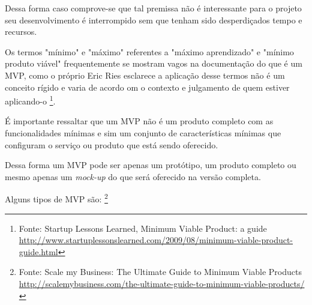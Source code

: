     \par Dessa forma caso comprove-se que tal premissa não é interessante para o projeto seu desenvolvimento é interrompido sem que tenham sido desperdiçados tempo e recursos.
    \par Os termos "mínimo" e "máximo" referentes a "máximo aprendizado" e "mínimo produto viável" frequentemente se mostram vagos na documentação do que é um MVP, como o próprio Eric Ries esclarece a aplicação desse termos não é um conceito rígido e varia de acordo om o contexto e julgamento de quem estiver aplicando-o \footnote{Fonte: Startup Lessons Learned, Minimum Viable Product: a guide \url{http://www.startuplessonslearned.com/2009/08/minimum-viable-product-guide.html}}. 
    \par É importante ressaltar que um MVP não é um produto completo com as funcionalidades  mínimas e sim um conjunto de características mínimas que configuram o serviço ou produto que está sendo oferecido.
    \par Dessa forma um MVP pode ser apenas um protótipo, um produto completo ou mesmo apenas um \emph{mock-up} do que será oferecido na versão completa.
    \par Alguns tipos de MVP são: \footnote{ Fonte: Scale my Business: The Ultimate Guide to Minimum Viable Products  \url{http://scalemybusiness.com/the-ultimate-guide-to-minimum-viable-products/}}
